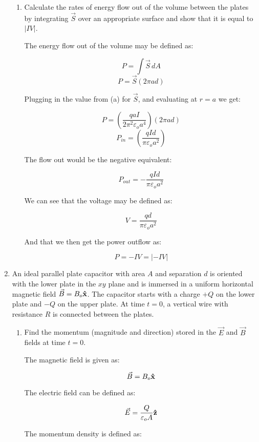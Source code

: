 \begin{enumerate}
\begin{enumerate}
      \item Calculate the rates of energy flow out of the volume between the plates by integrating $\vec{S}$ over an appropriate surface and show that it is equal to $|IV|$.

        The energy flow out of the volume may be defined as:

        $$P=\int \vec{S}\,dA$$
        $$P=\vec{S}(2\pi a d)$$

        Plugging in the value from (a) for $\vec{S}$, and evaluating at $r=a$ we get:

        $$P=\left( \frac{qaI}{2\pi^2\varepsilon_o a^4} \right)\left( 2\pi ad \right)$$
        $$P_{in}=\left( \frac{qId}{\pi\varepsilon_o a^2} \right)$$

        The flow out would be the negative equivalent:

        $$\boxed{P_{out}=-\frac{qId}{\pi\varepsilon_o a^2}}$$

        We can see that the voltage may be defined as:

        $$V=\frac{qd}{\pi\varepsilon_o a^2}$$

        And that we then get the power outflow as:

        $$P=-IV=|-IV|$$

    \end{enumerate}

  \item An ideal parallel plate capacitor with area $A$ and separation $d$ is oriented with the lower plate in the $xy$ plane and is immersed in a uniform horizontal magnetic field $\vec{B}=B_o\bold{\hat{x}}$. The capacitor starts with a charge $+Q$ on the lower plate and $-Q$ on the upper plate. At time $t=0$, a vertical wire with resistance $R$ is connected between the plates.

    \begin{enumerate}

      \item Find the momentum (magnitude and direction) stored in the $\vec{E}$ and $\vec{B}$ fields at time $t=0$.

        The magnetic field is given as:

        $$\vec{B}=B_o\bold{\hat{x}}$$

        The electric field can be defined as:

        $$\vec{E}=\frac{Q}{\varepsilon_o A}\bold{\hat{z}}$$

        The momentum density is defined as:


\end{enumerate}
\end{enumerate}
